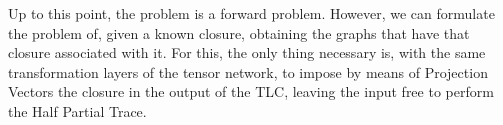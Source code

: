 Up to this point, the problem is a forward problem. However, we can formulate the problem of, given a known closure, obtaining the graphs that have that closure associated with it. For this, the only thing necessary is, with the same transformation layers of the tensor network, to impose by means of Projection Vectors the closure in the output of the TLC, leaving the input free to perform the Half Partial Trace.





































